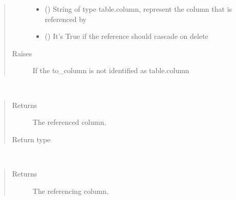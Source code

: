 \documentclass[letterpaper,10pt,english]{sphinxmanual}
\begin{document}
\begin{fulllineitems}
\begin{quote}
\begin{description}
\begin{itemize}
\item {} 
\sphinxAtStartPar
{} () \textendash{} String of type table.column, represent the column that is referenced by 

\item {} 
\sphinxAtStartPar
{} (\sphinxstyleliteralemphasis{\sphinxupquote{, }}) \textendash{} It’s True if the reference should cascade on delete

\end{itemize}

\item[{Raises}] \leavevmode
\sphinxAtStartPar
{} \textendash{} If the to\_column is not identified as table.column

\end{description}\end{quote}

\begin{fulllineitems}
\label{\detokenize{model:simple_sql.model.foreign_key.ForeignKey.get_column}}~\begin{quote}\begin{description}
\item[{Returns}] \leavevmode
\sphinxAtStartPar
The referenced column.

\item[{Return type}] \leavevmode
\sphinxAtStartPar
{\hyperref[\detokenize{model:simple_sql.model.column.Column}]{}}

\end{description}\end{quote}

\end{fulllineitems}


\begin{fulllineitems}
\label{\detokenize{model:simple_sql.model.foreign_key.ForeignKey.get_from_column}}~\begin{quote}\begin{description}
\item[{Returns}] \leavevmode
\sphinxAtStartPar
The referencing column.


\end{description}
\end{quote}
\end{fulllineitems}
\end{fulllineitems}
\end{document}

